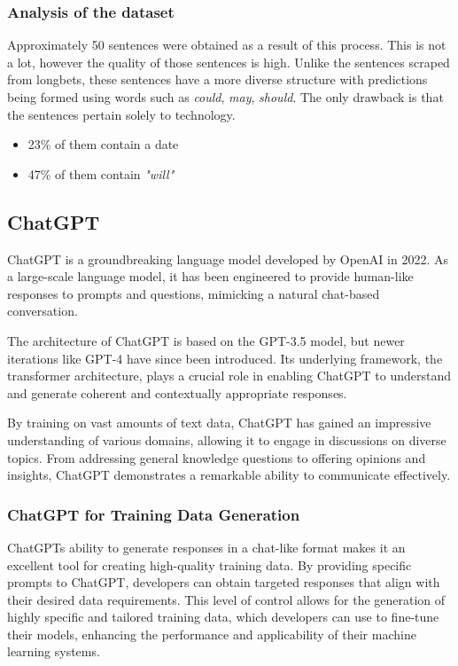 \documentclass[a4paper,10pt]{report} %
\begin{document}
\subsubsection{Analysis of the dataset}
Approximately 50 sentences were obtained as a result of this process. This is not a lot, however the quality of those sentences is high. Unlike the sentences scraped from longbets, these sentences have a more diverse structure with predictions being formed using words such as \textit{could}, \textit{may}, \textit{should}. The only drawback is that the sentences pertain solely to technology.

\begin{itemize}
  \item 23\% of them contain a date
  \item 47\% of them contain \textit{"will"}
\end{itemize}


\subsection{ChatGPT} %
ChatGPT is a groundbreaking language model developed by OpenAI in 2022. As a large-scale language model, it has been engineered to provide human-like responses to prompts and questions, mimicking a natural chat-based conversation. 

The architecture of ChatGPT is based on the GPT-3.5 model, but newer iterations like GPT-4 have since been introduced. Its underlying framework, the transformer architecture, plays a crucial role in enabling ChatGPT to understand and generate coherent and contextually appropriate responses.

By training on vast amounts of text data, ChatGPT has gained an impressive understanding of various domains, allowing it to engage in discussions on diverse topics. From addressing general knowledge questions to offering opinions and insights, ChatGPT demonstrates a remarkable ability to communicate effectively.

\subsubsection{ChatGPT for Training Data Generation}
ChatGPTs ability to generate responses in a chat-like format makes it an excellent tool for creating high-quality training data. By providing specific prompts to ChatGPT, developers can obtain targeted responses that align with their desired data requirements. This level of control allows for the generation of highly specific and tailored training data, which developers can use to fine-tune their models, enhancing the performance and applicability of their machine learning systems.
\end{document}
